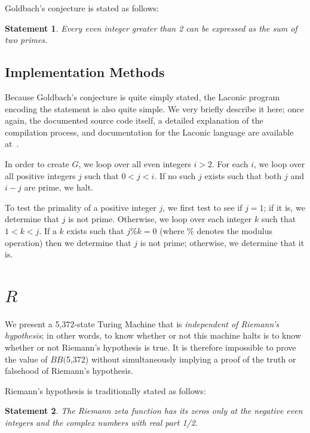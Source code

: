 \documentclass[11pt]{article}
\newtheorem{statement}{Statement}
\newcommand{\rmstatenumstate}{5,372-state }
\newcommand{\bbrmstatenum}{$BB($5,372) }
\begin{document}
Goldbach's conjecture is stated as follows:

\begin{statement}
\emph{Every even integer greater than 2 can be expressed as the sum of two primes.}
\label{goldbachstatement}
\end{statement}

\subsection{Implementation Methods}

Because Goldbach's conjecture is quite simply stated, the Laconic program encoding the statement is also quite simple. We very briefly describe it here; once again, the documented source code itself, a detailed explanation of the compilation process, and documentation for the Laconic language are available at~\cite{github}.

In order to create $G$, we loop over all even integers $i > 2$. For each $i$, we loop over all positive integers $j$ such that $0 < j < i$. If no such $j$ exists such that both $j$ and $i - j$ are prime, we halt.

To test the primality of a positive integer $j$, we first test to see if $j = 1$; if it is, we determine that $j$ is not prime. Otherwise, we loop over each integer $k$ such that $1 < k < j$. If a $k$ exists such that $j \% k = 0$ (where \% denotes the modulus operation) then we determine that $j$ is not prime; otherwise, we determine that it is.

\section{$R$}

We present a \rmstatenumstate Turing Machine that is \emph{independent of Riemann's hypothesis}; in other words, to know whether or not this machine halts is to know whether or not Riemann's hypothesis is true. It is therefore impossible to prove the value of \bbrmstatenum without simultaneously implying a proof of the truth or falsehood of Riemann's hypothesis.

Riemann's hypothesis is traditionally stated as follows:

\begin{statement}
\emph{The Riemann zeta function has its zeros only at the negative even integers and the complex numbers with real part 1/2.}
\label{goldbachstatement}
\end{statement}
\end{document}
